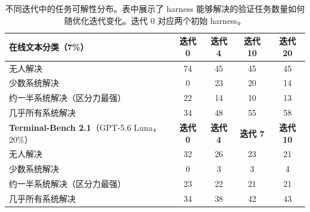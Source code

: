 \begin{table}[t]
\centering
\caption{不同迭代中的任务可解性分布。表中展示了 harness 能够解决的验证任务数量如何随优化迭代变化。迭代 0 对应两个初始 harness。}
\label{table:difficulty}
\small
\setlength{\tabcolsep}{6pt}
\begin{tabular}{lcccc}
\toprule
\textbf{在线文本分类}（7\%） & \textbf{迭代 0} & \textbf{迭代 4} & \textbf{迭代 10} & \textbf{迭代 20} \\
\midrule
无人解决 & 74 & 45 & 45 & 45 \\
少数系统解决 & 0 & 23 & 20 & 14 \\
约一半系统解决（区分力最强） & 22 & 14 & 10 & 13 \\
几乎所有系统解决 & 34 & 48 & 55 & 58 \\
\midrule[\heavyrulewidth]
\textbf{Terminal-Bench 2.1}（GPT-5.6 Luna，20\%） & \textbf{迭代 0} & \textbf{迭代 4} & \textbf{迭代 7} & \textbf{迭代 10} \\
\midrule
无人解决 & 32 & 26 & 23 & 21 \\
少数系统解决 & 0 & 3 & 3 & 4 \\
约一半系统解决（区分力最强） & 23 & 22 & 21 & 21 \\
几乎所有系统解决 & 34 & 38 & 42 & 43 \\
\bottomrule
\end{tabular}
\end{table}
